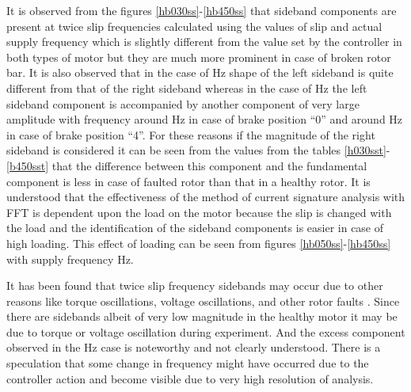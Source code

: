 \documentclass[a4paper,11pt]{report}
\begin{document}
\clearpage
It is observed from the figures \ref{hb030ss}-\ref{hb450ss} that sideband components are present at twice slip frequencies calculated using the values of slip and actual supply frequency which is slightly different from the value set by the controller in both types of motor but they are much more prominent in case of broken rotor bar. It is also observed that in the case of \unit[30]{Hz} shape of the left sideband is quite different from that of the right sideband whereas in the case of \unit[50]{Hz} the left sideband component is accompanied by another component of very large amplitude with frequency around \unit[48]{Hz} in case of brake position ``0'' and around \unit[49]{Hz} in case of brake position ``4''. For these reasons if the magnitude of the right sideband is considered it can be seen from the values from the tables \ref{h030sst}-\ref{b450sst} that the difference between this component and the fundamental component is less in case of faulted rotor than that in a healthy rotor. It is understood that the effectiveness of the method of current signature analysis with FFT is dependent upon the load on the motor because the slip is changed with the load and the identification of the sideband components is easier in case of high loading. This effect of loading can be seen from figures \ref{hb050ss}-\ref{hb450ss} with supply frequency \unit[50]{Hz}.

It has been found that twice slip frequency sidebands may occur due to other reasons like torque oscillations, voltage oscillations, and other rotor faults \cite{antonino}. Since there are sidebands albeit of very low magnitude in the healthy motor it may be due to torque or voltage oscillation during experiment. And the excess component observed in the \unit[50]{Hz} case is noteworthy and not clearly understood. There is a speculation that some change in frequency might have occurred due to the controller action and become visible due to very high resolution of analysis. 

\end{document}
